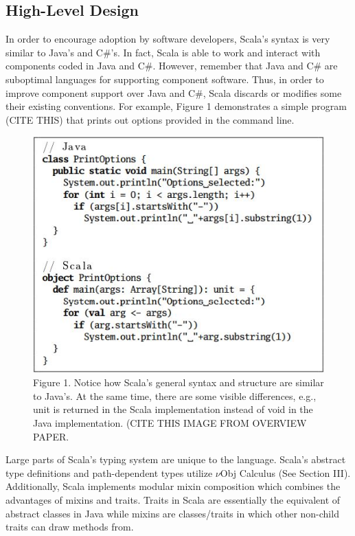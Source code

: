 \documentclass[jou,apacite]{IEEEtran}
\begin{document}
\subsection{High-Level Design}
In order to encourage adoption by software developers, Scala's syntax is very similar to Java's and C\#'s. In fact, Scala is able to work and interact with components coded in Java and C\#. However, remember that Java and C\# are suboptimal languages for supporting component software. Thus, in order to improve component support over Java and C\#, Scala discards or modifies some their existing conventions. For example, Figure 1 demonstrates a simple program (CITE THIS) that prints out options provided in the command line.
\begin{figure}[h]
    \centering
    \includegraphics[width=\columnwidth]{exampl1.JPG}
    \caption{Figure 1. Notice how Scala's general syntax and structure are similar to Java's. At the same time, there are some visible differences, e.g., unit is returned in the Scala implementation instead of void in the Java implementation. (CITE THIS IMAGE FROM OVERVIEW PAPER.}
\end{figure}
Large parts of Scala's typing system are unique to the language. Scala's abstract type definitions and path-dependent types utilize $\nu$Obj Calculus (See Section III). Additionally, Scala implements modular mixin composition which combines the advantages of mixins and traits. Traits in Scala are essentially the equivalent of abstract classes in Java while mixins are classes/traits in which other non-child traits can draw methods from. \\\\
\end{document}

